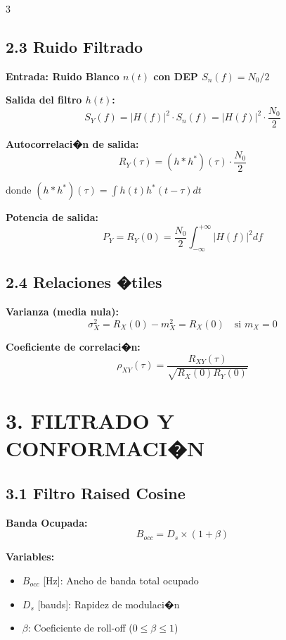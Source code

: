 ﻿\documentclass[8pt,a4paper]{article}
\begin{document}
\begin{multicols}{3}
\vspace{-2mm}
\subsection*{\small 2.3 Ruido Filtrado}
\vspace{-2mm}

\textbf{Entrada: Ruido Blanco $n(t)$ con DEP $S_n(f) = N_0/2$}

\textbf{Salida del filtro $h(t)$:}
\[
S_Y(f) = |H(f)|^2 \cdot S_n(f) = |H(f)|^2 \cdot \frac{N_0}{2}
\]

\textbf{Autocorrelaci�n de salida:}
\[
R_Y(\tau) = (h * h^*)(\tau) \cdot \frac{N_0}{2}
\]

donde $(h * h^*)(\tau) = \int h(t)h^*(t-\tau)dt$

\textbf{Potencia de salida:}
\[
P_Y = R_Y(0) = \frac{N_0}{2} \int_{-\infty}^{+\infty} |H(f)|^2 df
\]

\vspace{-2mm}
\subsection*{\small 2.4 Relaciones �tiles}
\vspace{-2mm}

\textbf{Varianza (media nula):}
\[
\sigma_X^2 = R_X(0) - m_X^2 = R_X(0) \quad \text{si } m_X = 0
\]

\textbf{Coeficiente de correlaci�n:}
\[
\rho_{XY}(\tau) = \frac{R_{XY}(\tau)}{\sqrt{R_X(0)R_Y(0)}}
\]

\vspace{-2mm}
\section*{\color{sectioncolor}\normalsize 3. FILTRADO Y CONFORMACI�N}
\vspace{-3mm}

\subsection*{\small 3.1 Filtro Raised Cosine}
\vspace{-2mm}

\textbf{Banda Ocupada:}
\[
B_{occ} = D_s \times (1 + \beta)
\]

\textbf{Variables:}
\begin{itemize}[leftmargin=*,itemsep=0pt]
    \item $B_{occ}$ [Hz]: Ancho de banda total ocupado
    \item $D_s$ [bauds]: Rapidez de modulaci�n
    \item $\beta$: Coeficiente de roll-off ($0 \leq \beta \leq 1$)
\end{itemize}


\end{multicols}
\end{document}
